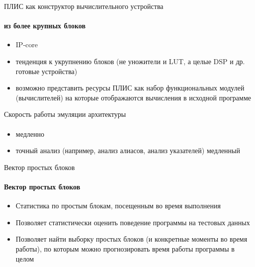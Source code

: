 \documentclass{beamer}              %
\begin{document}
\begin{frame}{ПЛИС как конструктор вычислительного устройства}
  \framesubtitle{из более крупных блоков}
  
  \begin{itemize}
      \item IP-core
      \item тенденция к укрупнению блоков (не уножители и LUT, а целые DSP и др. готовые устройства) 
      \item возможно представить ресурсы ПЛИС как набор функциональных модулей (вычислителей) на которые отображаются вычисления в исходной программе
 \end{itemize}
  
\end{frame}

\begin{frame}{Скорость работы эмуляции архитектуры}
  \framesubtitle{}
  
  \begin{itemize}
      \item медленно
      \item точный анализ (например, анализ алиасов, анализ указателей) медленный
  \end{itemize}

\end{frame}

\begin{frame}{Вектор простых блоков}
  \framesubtitle{Вектор простых блоков}
  
  \begin{itemize}
      \item Статистика по простым блокам, посещенным во время выполнения
      \item Позволяет статистически оценить поведение программы на тестовых данных
      \item Позволяет найти выборку простых блоков (и конкретные моменты во время работы), по которым можно прогнозировать время работы программы в целом
  \end{itemize}
  
\end{frame}
\end{document}
